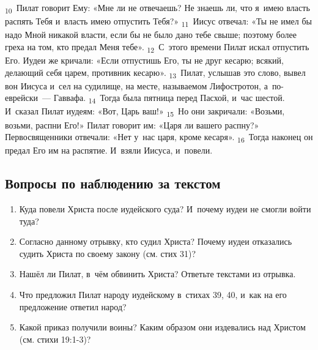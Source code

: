 \documentclass[a4paper,12pt]{article}
\begin{document}
\textsubscript{10}~Пилат говорит Ему: «Мне ли не отвечаешь? Не знаешь ли, что я~имею власть распять Тебя и~власть имею отпустить Тебя?»
\textsubscript{11}~Иисус отвечал: «Ты не имел бы надо Мной никакой власти, если бы не было дано тебе свыше; поэтому более греха на том, кто предал Меня тебе».
\textsubscript{12}~С~этого времени Пилат искал отпустить Его. Иудеи же кричали: «Если отпустишь Его, ты не друг кесарю; всякий, делающий себя царем, противник кесарю».
\textsubscript{13}~Пилат, услышав это слово, вывел вон Иисуса и~сел на судилище, на месте, называемом Лифостротон, а~по-еврейски~--- Гаввафа.
\textsubscript{14}~Тогда была пятница перед Пасхой, и~час шестой. И~сказал Пилат иудеям: «Вот, Царь ваш!»
\textsubscript{15}~Но они закричали: «Возьми, возьми, распни Его!» Пилат говорит им: «Царя ли вашего распну?» Первосвященники отвечали: «Нет у~нас царя, кроме кесаря».
\textsubscript{16}~Тогда наконец он предал Его им на распятие. И~взяли Иисуса, и~повели. 
\subsection*{Вопросы по наблюдению за текстом}
\begin{enumerate}
    \item Куда повели Христа после иудейского суда? И~почему иудеи не смогли войти туда? 
    
    \myline
    
    \myline
    \item Согласно данному отрывку, кто судил Христа? Почему иудеи отказались судить Христа по своему закону (см. стих 31)? 
    
    \myline
    
    \myline
    \item Нашёл ли Пилат, в~чём обвинить Христа? Ответьте текстами из отрывка. 
    
    \myline
    
    \myline
    \item Что предложил Пилат народу иудейскому в~стихах 39, 40, и~как на его предложение ответил народ? 
    
    \myline
    
    \myline
    \item Какой приказ получили воины? Каким образом они издевались над Христом (см. стихи 19:1-3)? 
    
    \myline
    
    \myline
\end{enumerate}
\end{document}
